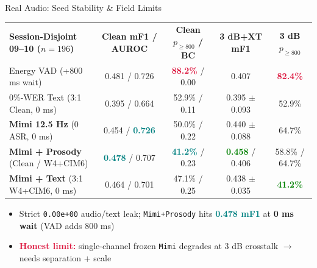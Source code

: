 \documentclass[aspectratio=169,10pt]{beamer}
\newcommand{\accentt}[1]{\textcolor{Teal}{\textbf{#1}}}
\newcommand{\accentg}[1]{\textcolor{Green}{\textbf{#1}}}
\newcommand{\accentr}[1]{\textcolor{Crimson}{\textbf{#1}}}
\begin{document}
\begin{frame}{Real Audio: Seed Stability \& Field Limits}
  \vspace*{0.08cm}
  \begin{center}
  \footnotesize
  \setlength{\tabcolsep}{3.0pt}
  \renewcommand{\arraystretch}{1.35}
  \begin{tabular}{@{}lcccc@{}}
    \textbf{\color{Teal}Session-Disjoint 09--10 ($n=196$)} & \textbf{\color{Teal}Clean mF1 / AUROC} & \textbf{\color{Teal}Clean $p_{\ge 800}$ / BC} & \textbf{\color{Teal}3 dB+XT mF1} & \textbf{\color{Teal}3 dB $p_{\ge 800}$} \\
    \arrayrulecolor{Hairline}\midrule
    Energy VAD {\scriptsize (+800 ms wait)} & 0.481 / 0.726 & \accentr{88.2\%} / 0.00 & 0.407 & \accentr{82.4\%} \\
    \midrule
    0\%-WER Text {\scriptsize (3:1 Clean, 0 ms)} & 0.395 / 0.664 & 52.9\% / 0.11 & 0.395 $\pm$ 0.093 & 52.9\% \\
    \midrule
    \textbf{Mimi 12.5 Hz} {\scriptsize (0 ASR, 0 ms)} & 0.454 / \accentt{0.726} & 50.0\% / 0.22 & 0.440 $\pm$ 0.088 & 64.7\% \\
    \midrule
    \textbf{Mimi + Prosody} {\scriptsize (Clean / W4+CIM6)} & \accentt{0.478} / 0.707 & \accentt{41.2\%} / 0.23 & \accentg{0.458} / 0.406 & 58.8\% / 64.7\% \\
    \midrule
    \textbf{Mimi + Text} {\scriptsize (3:1 W4+CIM6, 0 ms)} & 0.464 / 0.701 & 47.1\% / 0.25 & 0.438 $\pm$ 0.035 & \accentg{41.2\%} \\
    \bottomrule
  \end{tabular}
  \end{center}
  \vspace*{0.22cm}
  \begin{itemize}\setlength{\itemsep}{0.40em}
    \item {\small Strict \texttt{0.00e+00} audio/text leak; \texttt{Mimi+Prosody} hits \accentt{0.478 mF1} at \textbf{0 ms wait} (VAD adds 800 ms)}
    \item {\small \accentr{Honest limit:} single-channel frozen \texttt{Mimi} degrades at 3 dB crosstalk $\to$ needs separation + scale}
  \end{itemize}
\end{frame}
\end{document}
